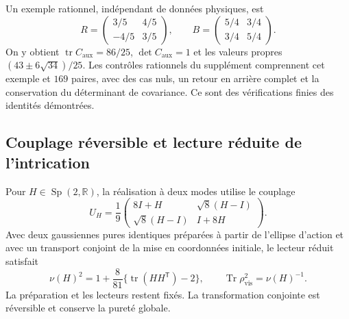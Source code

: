 Un exemple rationnel, indépendant de données physiques, est
\begin{equation}
 R=\begin{pmatrix}3/5&4/5\\-4/5&3/5\end{pmatrix},\qquad
 B=\begin{pmatrix}5/4&3/4\\3/4&5/4\end{pmatrix}.
 \label{md:aux:ejemplo-racional}
\end{equation}
On y obtient $\operatorname{tr}C_{\mathrm{aux}}=86/25$,
$\det C_{\mathrm{aux}}=1$ et les valeurs propres
$(43\pm6\sqrt{34})/25$. Les contrôles rationnels du supplément
comprennent cet exemple et $169$ paires, avec des cas nuls, un retour en arrière
complet et la conservation du déterminant de covariance. Ce sont
des vérifications finies des identités démontrées.

\subsection{Couplage réversible et lecture réduite de l’intrication}
\label{md:aux:acoplamiento}

Pour $H\in\operatorname{Sp}(2,\mathbb R)$, la réalisation à deux
modes utilise le couplage
\begin{equation}
 U_H=\frac19\begin{pmatrix}
 8I+H&\sqrt8(H-I)\\
 \sqrt8(H-I)&I+8H
 \end{pmatrix}.
 \label{md:aux:acoplamiento-uh}
\end{equation}
Avec deux gaussiennes pures identiques préparées à partir de l’ellipse
d’action et avec un transport conjoint de la mise en coordonnées initiale, le lecteur
réduit satisfait
\begin{equation}
 \nu(H)^2=1+\frac8{81}
    \bigl\{\operatorname{tr}(HH^{\mathsf T})-2\bigr\},
 \qquad\operatorname{Tr}\rho_{\mathrm{vis}}^2=\nu(H)^{-1}.
 \label{md:aux:mezcla-generica}
\end{equation}
La préparation et les lecteurs restent fixés. La
transformation conjointe est réversible et conserve la pureté globale.


